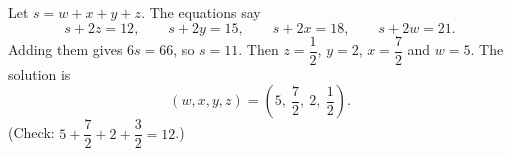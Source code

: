 Let $s=w+x+y+z$. The equations say
\[s+2z=12,\qquad s+2y=15,\qquad s+2x=18,\qquad s+2w=21 .\]
Adding them gives $6s=66$, so $s=11$. Then $z=\dfrac{1}{2}$, $y=2$, $x=\dfrac{7}{2}$ and $w=5$. The solution is
\[\boxed{(w,x,y,z)=\left(5,\ \dfrac{7}{2},\ 2,\ \dfrac{1}{2}\right)}.\]
(Check: $5+\dfrac{7}{2}+2+\dfrac{3}{2}=12$.)
